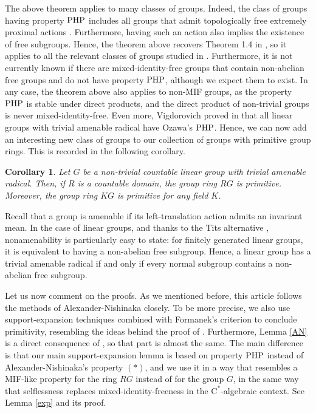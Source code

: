 \documentclass[11pt]{article}
\newtheorem{cor}[thm]{Corollary}
\theoremstyle{definition}
\theoremstyle{remark}
\numberwithin{equation}{section}
\numberwithin{equation}{section}
\newcommand{\Cs}{\ensuremath{\mathrm{C}^\ast}}
\numberwithin{equation}{section}
\begin{document}
The above theorem applies to many classes of groups. Indeed, the class of groups having property ${\rm PHP}$ includes all groups that admit topologically free extremely proximal actions \cite{Oz25}. Furthermore, having such an action also implies the existence of free subgroups. Hence, the theorem above recovers Theorem 1.4 in \cite{Fl26}, so it applies to all the relevant classes of groups studied in \cite{BrIvOm20,Vi26,FKOCP26,BaFl26,Ry26}. Furthermore, it is not currently known if there are mixed-identity-free groups that contain non-abelian free groups and do not have property $\rm PHP$, although we expect them to exist. In any case, the theorem above also applies to non-MIF groups, as the property ${\rm PHP}$ is stable under direct products, and the direct product of non-trivial groups is never mixed-identity-free. Even more, Vigdorovich proved in \cite[Theorem 1.2]{Vi26} that all linear groups with trivial amenable radical have Ozawa's ${\rm PHP}$. Hence, we can now add an interesting new class of groups to our collection of groups with primitive group rings. This is recorded in the following corollary.


\begin{cor}\label{maincor}
Let $G$ be a non-trivial countable linear group with trivial amenable radical. Then, if $R$ is a countable domain, the group ring $RG$ is primitive. Moreover, the group ring $KG$ is primitive for any field $K$.
\end{cor}

Recall that a group is amenable if its left-translation action admits an invariant mean. In the case of linear groups, and thanks to the Tits alternative \cite{Ti72}, nonamenability is particularly easy to state: for finitely generated linear groups, it is equivalent to having a non-abelian free subgroup. Hence, a linear group has a trivial amenable radical if and only if every normal subgroup contains a non-abelian free subgroup.

Let us now comment on the proofs. As we mentioned before, this article follows the methods of Alexander-Nishinaka \cite{AlNi17} closely. To be more precise, we also use support-expansion techniques combined with Formanek's criterion \cite[Theorem 1]{Fo73} to conclude primitivity, resembling the ideas behind the proof of \cite[Theorem 1.1]{AlNi17}. Furthermore, Lemma \ref{AN} is a direct consequence of \cite[Lemma 3.5]{AlNi17}, so that part is almost the same. The main difference is that our main support-expansion lemma is based on property $\rm PHP$ instead of Alexander-Nishinaka's property $(*)$, and we use it in a way that resembles a MIF-like property for the ring $RG$ instead of for the group $G$, in the same way that selflessness replaces mixed-identity-freeness in the \Cs-algebraic context. See Lemma \ref{exp} and its proof. 
\end{document}
